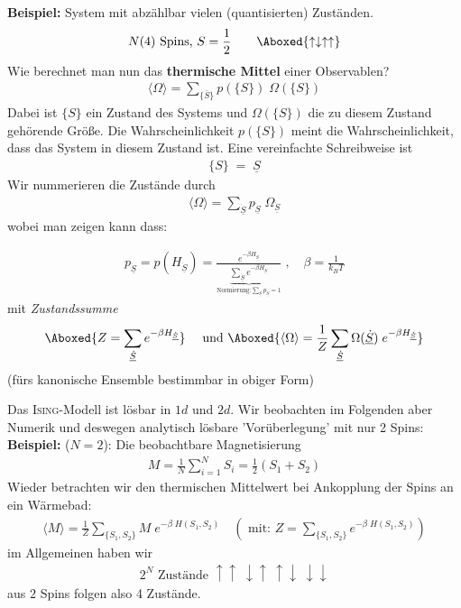 \documentclass[12pt]{article}
\begin{document}
\begin{itemize}
\textbf{Beispiel:} System mit abzählbar vielen (quantisierten) Zuständen.  
\begin{align*}
N(4) \mbox{ Spins, } S= \frac{1}{2} \quad \quad \Aboxed{ \uparrow \downarrow \uparrow \uparrow }
\end{align*}
Wie berechnet man nun das \textbf{thermische Mittel} einer Observablen?
\begin{align}
\langle \Omega \rangle= \sum_{ \{\bar{S} \}}  p(\{ S \}) \; \Omega(\{S\})
\end{align}
Dabei ist $\{ S \}$ ein Zustand des Systems und $\Omega(\{ S \})$ die zu diesem Zustand gehörende Größe. Die Wahrscheinlichkeit $p(\{ S \})$ meint die Wahrscheinlichkeit, dass das System in diesem Zustand ist. Eine vereinfachte Schreibweise ist
\begin{align*}
\{ S \} \; \widehat{=} \; \underline{S}
\end{align*}
Wir nummerieren die Zustände durch
\begin{align}
\langle \Omega \rangle = \sum_{\underline{\dot{S}}} p_{\underline{\dot{S}}} \; \Omega_{\underline{\dot{S}}}
\end{align}
wobei man zeigen kann dass:

\begin{align}
p_{\underline{\dot{S}}} = p ( H_{\underline{\dot{S}}}) = \frac{e^{- \beta H_{\underline{\dot{S}}} }}{\underbrace{ 
\sum_{\underline{\dot{S}}}  e^{-\beta H_{\underline{\dot{S}}} } 
}_{\text{Normierung:} \sum_{\underline{\dot{S}}} p_{\underline{\dot{S}}} =1 }}\; , \quad \beta = \frac{1}{k_BT}
\end{align}
mit \textit{Zustandssumme} 
\begin{align}
\Aboxed{ Z= \sum_{\underline{\dot{S}}} e^{- \beta H_{\underline{\dot{S}}} } }
\quad
\mbox{ und }  \Aboxed{ \langle \Omega \rangle = \frac{1}{Z}  \sum_{\underline{\dot{S}}} \Omega({\underline{\dot{S}}}) \;  e^{- \beta H_{\underline{\dot{S}}} }}
\end{align} (fürs kanonische Ensemble bestimmbar in obiger Form)
\end{itemize}
Das \textsc{Ising}-Modell ist lösbar in $1d$ und $2d$. Wir beobachten im Folgenden aber Numerik und deswegen analytisch lösbare 'Vorüberlegung' mit nur 2 Spins:\\
\textbf{ Beispiel:} ($N=2$): 
Die beobachtbare Magnetisierung 
\begin{align}
M = \frac{1}{N} \sum_{i=1}^N S_i = \frac{1}{2} (S_1 + S_2)
\end{align}
Wieder betrachten wir den thermischen Mittelwert bei Ankopplung der Spins an ein Wärmebad:
\begin{align}
\langle M \rangle = \frac{1}{Z} \sum_{ \{ S_1, S_2 \} } M \; e^{- \beta \;  H(S_1,S_2)} \quad \left(\mbox{ mit: } Z = \sum_{ \{ S_1, S_2 \} }  e^{- \beta \; H(S_1, S_2)} \right)
\end{align}
im Allgemeinen haben wir
\begin{align*}
2^N \mbox{ Zustände } \uparrow \uparrow \; \downarrow \uparrow \; \uparrow \downarrow \; \downarrow \downarrow
\end{align*}
aus $2$ Spins folgen also 4 Zustände.
\end{document}
